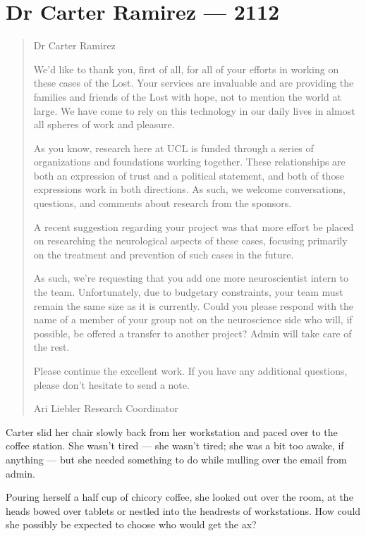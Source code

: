 \hypertarget{dr-carter-ramirez-2112}{%
\chapter*{Dr Carter Ramirez — 2112}\label{dr-carter-ramirez-2112}}

\begin{quote}
Dr Carter Ramirez

We'd like to thank you, first of all, for all of your efforts in working on these cases of the Lost. Your services are invaluable and are providing the families and friends of the Lost with hope, not to mention the world at large. We have come to rely on this technology in our daily lives in almost all spheres of work and pleasure.

As you know, research here at UCL is funded through a series of organizations and foundations working together. These relationships are both an expression of trust and a political statement, and both of those expressions work in both directions. As such, we welcome conversations, questions, and comments about research from the sponsors.

A recent suggestion regarding your project was that more effort be placed on researching the neurological aspects of these cases, focusing primarily on the treatment and prevention of such cases in the future.

As such, we're requesting that you add one more neuroscientist intern to the team. Unfortunately, due to budgetary constraints, your team must remain the same size as it is currently. Could you please respond with the name of a member of your group not on the neuroscience side who will, if possible, be offered a transfer to another project? Admin will take care of the rest.

Please continue the excellent work. If you have any additional questions, please don't hesitate to send a note.

Ari Liebler Research Coordinator
\end{quote}

Carter slid her chair slowly back from her workstation and paced over to the coffee station. She wasn't tired — she wasn't tired; she was a bit too awake, if anything — but she needed something to do while mulling over the email from admin.

Pouring herself a half cup of chicory coffee, she looked out over the room, at the heads bowed over tablets or nestled into the headrests of workstations. How could she possibly be expected to choose who would get the ax?


